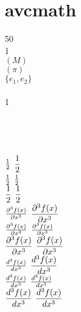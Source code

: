 \newpage
\section*{avcmath}\indent

50\eth \\

1\ird \\

\tr$(M)$ \\

\sgn$(\pi)$ \\

\spn$\{e_1,e_2\}$ \\

\bs \\

1\ird {}\ird \\

 \\

 \\

 \\

 \\

$\textstyle \frac {1}{2}$ $\displaystyle \frac {1}{2}$ \\

$\textstyle \tfrac{1}{2}$ $\displaystyle \tfrac{1}{2}$ \\

$\textstyle \dfrac{1}{2}$ $\displaystyle \dfrac{1}{2}$ \\

$\textstyle \frac {\partial^3f(x)}{\partial x^3}$ $\displaystyle \frac {\partial^3f(x)}{\partial x^3}$ \\

$\textstyle \tfrac{\partial^3f(x)}{\partial x^3}$ $\displaystyle \tfrac{\partial^3f(x)}{\partial x^3}$ \\

$\textstyle \dfrac{\partial^3f(x)}{\partial x^3}$ $\displaystyle \dfrac{\partial^3f(x)}{\partial x^3}$ \\

$\textstyle \frac {d ^3f(x)}{d x^3}$ $\displaystyle \frac {d ^3f(x)}{d x^3}$ \\

$\textstyle \tfrac{d ^3f(x)}{d x^3}$ $\displaystyle \tfrac{d ^3f(x)}{d x^3}$ \\

$\textstyle \dfrac{d ^3f(x)}{d x^3}$ $\displaystyle \dfrac{d ^3f(x)}{d x^3}$ \\


